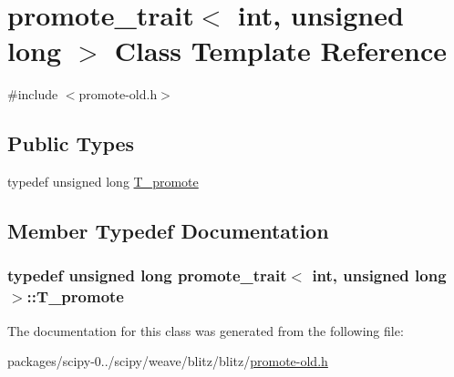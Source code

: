\hypertarget{classpromote__trait_3_01int_00_01unsigned_01long_01_4}{}\section{promote\+\_\+trait$<$ int, unsigned long $>$ Class Template Reference}
\label{classpromote__trait_3_01int_00_01unsigned_01long_01_4}


{\ttfamily \#include $<$promote-\/old.\+h$>$}

\subsection*{Public Types}
\begin{DoxyCompactItemize}
\item 
typedef unsigned long \hyperlink{classpromote__trait_3_01int_00_01unsigned_01long_01_4_a7d59a82e0b239c04d7e28de1c6685ff4}{T\+\_\+promote}
\end{DoxyCompactItemize}


\subsection{Member Typedef Documentation}
\hypertarget{classpromote__trait_3_01int_00_01unsigned_01long_01_4_a7d59a82e0b239c04d7e28de1c6685ff4}{}
\subsubsection[{T\+\_\+promote}]{\setlength{\rightskip}{0pt plus 5cm}typedef unsigned long {\bf promote\+\_\+trait}$<$ int, unsigned long $>$\+::{\bf T\+\_\+promote}}\label{classpromote__trait_3_01int_00_01unsigned_01long_01_4_a7d59a82e0b239c04d7e28de1c6685ff4}


The documentation for this class was generated from the following file\+:\begin{DoxyCompactItemize}
\item 
packages/scipy-\/0../scipy/weave/blitz/blitz/\hyperlink{promote-old_8h}{promote-\/old.\+h}\end{DoxyCompactItemize}

